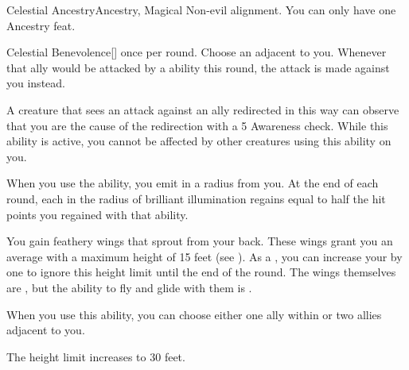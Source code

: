   \begin{magicalfeat}{Celestial Ancestry}{Ancestry, Magical}
    \featpre Non-evil alignment.
     You can only have one Ancestry feat.

    \begin{activeability}{Celestial Benevolence}[]
        \abilityusagetime {} once per round.
        \rankline
        Choose an  adjacent to you.
        Whenever that ally would be attacked by a  ability this round, the attack is made against you instead.

        A creature that sees an attack against an ally redirected in this way can observe that you are the cause of the redirection with a  5 Awareness check.
        While this ability is active, you cannot be affected by other creatures using this ability on you.
    \end{activeability}

     When you use the  ability, you  emit  in a \largearea radius  from you.
    At the end of each round, each  in the radius of brilliant illumination regains  equal to half the hit points you regained with that  ability.

     You gain feathery wings that sprout from your back.
    These wings grant you an average  with a maximum height of 15 feet (see ).
    As a , you can increase your  by one to ignore this height limit until the end of the round.
    The wings themselves are , but the ability to fly and glide with them is \magical.

     When you use this ability, you can choose either one ally within \shortrange or two allies adjacent to you.

     The height limit increases to 30 feet.
  \end{magicalfeat}


